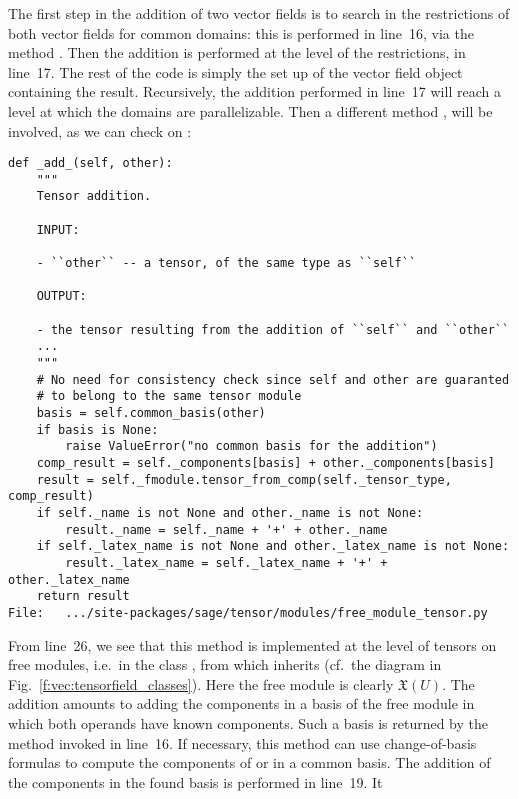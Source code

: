 The first step in the addition of two vector fields is to search in the
restrictions of both vector fields for common domains: this is performed in
line~16, via the method . Then the addition is
performed at the level of the restrictions, in line~17. The rest of the code
is simply the set up of the vector field object containing the result.
Recursively, the addition performed in line~17 will reach a level at which
the domains are parallelizable. Then a different method , will
be involved, as we can check on :
\begin{lstlisting}
def _add_(self, other):
    """
    Tensor addition.

    INPUT:

    - ``other`` -- a tensor, of the same type as ``self``

    OUTPUT:

    - the tensor resulting from the addition of ``self`` and ``other``
    ...
    """
    # No need for consistency check since self and other are guaranted
    # to belong to the same tensor module
    basis = self.common_basis(other)
    if basis is None:
        raise ValueError("no common basis for the addition")
    comp_result = self._components[basis] + other._components[basis]
    result = self._fmodule.tensor_from_comp(self._tensor_type, comp_result)
    if self._name is not None and other._name is not None:
        result._name = self._name + '+' + other._name
    if self._latex_name is not None and other._latex_name is not None:
        result._latex_name = self._latex_name + '+' + other._latex_name
    return result
File:   .../site-packages/sage/tensor/modules/free_module_tensor.py
\end{lstlisting}
From line~26, we see that this method  is implemented
at the level of tensors on free modules, i.e.\ in the class
,
from which  inherits (cf.\ the diagram in
Fig.~\ref{f:vec:tensorfield_classes}). Here the free module is clearly
$\mathfrak{X}(U)$. The addition amounts to adding the components in a
basis of the free module in which both operands have known components. Such
a basis is returned by the method  invoked in line~16.
If necessary, this method can use change-of-basis formulas to compute the
components of  or  in a common basis.
The addition of the components in the found basis is performed in line~19. It
